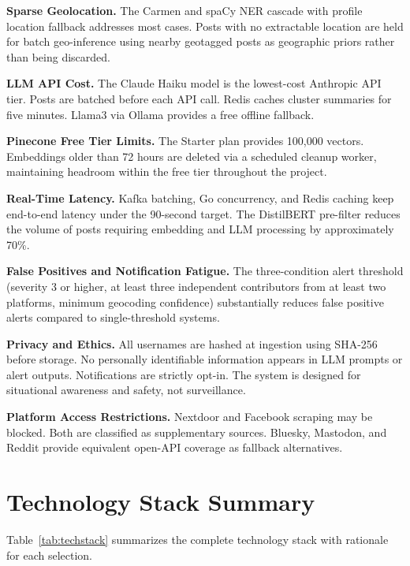 \documentclass[conference]{IEEEtran}
\begin{document}
\textbf{Sparse Geolocation.} The Carmen and spaCy NER cascade with profile location
fallback addresses most cases. Posts with no extractable location are held for
batch geo-inference using nearby geotagged posts as geographic priors rather
than being discarded.

\textbf{LLM API Cost.} The Claude Haiku model is the lowest-cost Anthropic API
tier. Posts are batched before each API call. Redis caches cluster summaries for
five minutes. Llama3 via Ollama provides a free offline fallback.

\textbf{Pinecone Free Tier Limits.} The Starter plan provides 100,000 vectors.
Embeddings older than 72 hours are deleted via a scheduled cleanup worker,
maintaining headroom within the free tier throughout the project.

\textbf{Real-Time Latency.} Kafka batching, Go concurrency, and Redis caching
keep end-to-end latency under the 90-second target. The DistilBERT pre-filter
reduces the volume of posts requiring embedding and LLM processing by approximately
70\%.

\textbf{False Positives and Notification Fatigue.} The three-condition alert
threshold (severity 3 or higher, at least three independent contributors from
at least two platforms, minimum geocoding confidence) substantially reduces
false positive alerts compared to single-threshold systems.

\textbf{Privacy and Ethics.} All usernames are hashed at ingestion using SHA-256
before storage. No personally identifiable information appears in LLM prompts
or alert outputs. Notifications are strictly opt-in. The system is designed for
situational awareness and safety, not surveillance.

\textbf{Platform Access Restrictions.} Nextdoor and Facebook scraping may be
blocked. Both are classified as supplementary sources. Bluesky, Mastodon, and
Reddit provide equivalent open-API coverage as fallback alternatives.

\section{Technology Stack Summary}

Table~\ref{tab:techstack} summarizes the complete technology stack with
rationale for each selection.
\end{document}
